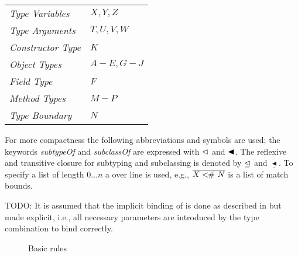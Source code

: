 \begin{table}[H]
	\begin{tabular}{ll}
		\textit{Type Variables} & $X, Y, Z$ \\
		\textit{Type Arguments} & $T, U, V, W$ \\
		\textit{Constructor Type} & $K$ \\
		\textit{Object Types} & $A - E, G - J$ \\
		\textit{Field Type} & $F$ \\
		\textit{Method Types} & $M - P$ \\
		\textit{Type Boundary} & $N$
	\end{tabular}
\end{table}

For more compactness the following abbreviations and symbols are used; the
keywords \emph{subtypeOf} and \emph{subclassOf} are expressed with $\vartriangleleft$
and $\blacktriangleleft$. The reflexive and transitive closure for subtyping and
subclassing is denoted by $\trianglelefteq$ and $\underline{\blacktriangleleft}$.
To specify a list of length $0\ldots n$ a over line is used, e.g.,
$\overline{X <\!\!\#~ N}$ is a list of match bounds.

TODO:
It is assumed that the implicit binding of \mytype is done as described in  but made explicit, i.e., all necessary parameters are introduced by the type combination to bind \mytype correctly.

\begin{figure}[H]
	\caption{Basic rules}
	\label{fig:basicRules}
\end{figure}

